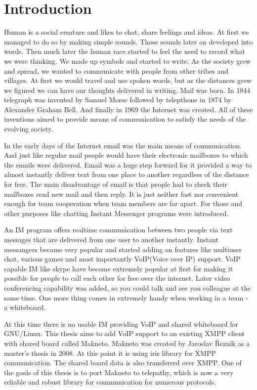 
\chapter{Introduction}
Human is a social creature and likes to chat, share feelings and ideas. At first we managed to do so by making simple sounds. Those sounds later on developed into words. Then much later the human race started to feel the need to record what we were thinking. We made up symbols and started to write. As the society grew and spread, we wanted to communicate with people from other tribes and villages. At first we would travel and use spoken words, but as the distances grew we figured we can have our thoughts delivered in writing. Mail was born. In 1844 telegraph was invented by Samuel Morse followed by telepthone in 1874 by Alexander Graham Bell. And finally in 1969 the Internet was created. All of these inventions aimed to provide means of communication to satisfy the needs of the evolving society.  

In the early days of the Internet email was the main means of communication. And just like regular mail people would have their electronic mailboxes to which the emails were delivered. Email was a huge step forward for it provided a way to almost instantly deliver text from one place to another regardless of the distance for free. The main disadvantage of email is that people had to check their mailboxes read new mail and then reply. It is just neither fast nor convenient enough for team cooperation when team members are far apart. For those and other purposes like chatting Instant Messenger programs were introduced.    

An IM program offers realtime communication between two people via text messages that are delivered from one user to another instantly. Instant messangers became very popular and started adding on features like multiuser chat, various games and most importantly VoIP(Voice over IP) support. VoIP capable IM like skype have become extremely popular at first for making it possible for people to call each other for free over the internet. Later video conferencing capability was added, so you could talk and see you colleague at the same time. One more thing comes in extremely handy when working in a team - a whiteboard.

At this time there is no usable IM providing VoIP and shared whiteboard for GNU/Linux. This thesis aims to add VoIP support to an existing XMPP client with shared board called Makneto. Makneto was created by Jaroslav Řezník as a master's thesis in 2008. At this point it is using iris library for XMPP communication. The shared board data is also transferred over XMPP. One of the goals of this thesis is to port Makneto to telepathy, which is now a very reliable and robust library for communication for numerous protocols.  

